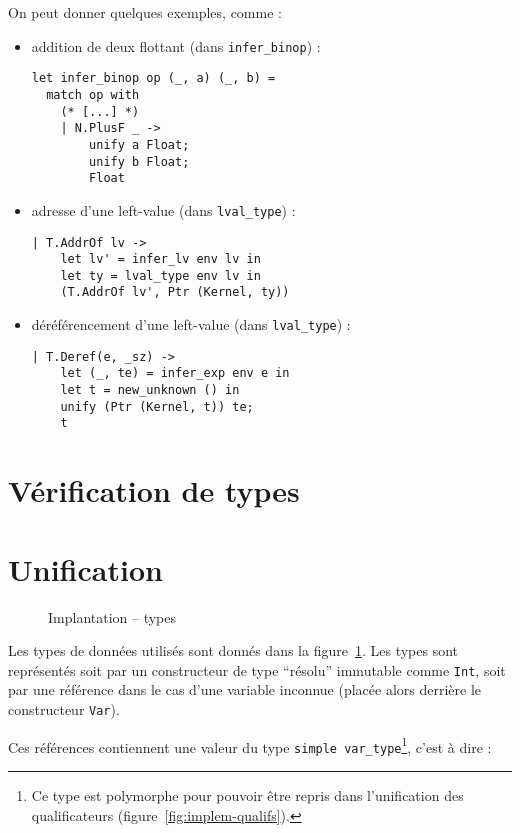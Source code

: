 On peut donner quelques exemples, comme :

\begin{itemize}
  \item addition de deux flottant (dans \texttt{infer\_binop}) :

\begin{verbatim}
let infer_binop op (_, a) (_, b) =
  match op with
    (* [...] *)
    | N.PlusF _ ->
        unify a Float;
        unify b Float;
        Float
\end{verbatim}

  \item adresse d'une left-value (dans \texttt{lval\_type}) :

\begin{verbatim}
| T.AddrOf lv ->
    let lv' = infer_lv env lv in
    let ty = lval_type env lv in
    (T.AddrOf lv', Ptr (Kernel, ty))
\end{verbatim}

  \item déréférencement d'une left-value (dans \texttt{lval\_type}) :

\begin{verbatim}
| T.Deref(e, _sz) ->
    let (_, te) = infer_exp env e in
    let t = new_unknown () in
    unify (Ptr (Kernel, t)) te;
    t
\end{verbatim}

\end{itemize}

\section{Vérification de types}

\section{Unification}

\begin{figure}
\caption{Implantation -- types}
\label{fig:implem-typ}
\end{figure}

Les types de données utilisés sont donnés dans la figure~\ref{fig:implem-typ}.
Les types \langname sont représentés soit par un constructeur de type ``résolu''
immutable comme \texttt{Int}, soit par une référence dans le cas d'une variable
inconnue (placée alors derrière le constructeur \texttt{Var}).

Ces références contiennent une valeur du type
\texttt{simple var\_type}\footnote{
  Ce type est polymorphe pour pouvoir être repris dans l'unification des
  qualificateurs (figure~\ref{fig:implem-qualifs}).
}, c'est à
dire :

